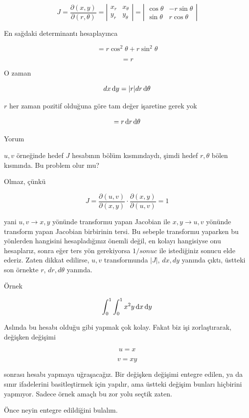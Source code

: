 \documentclass[12pt,fleqn]{article}\usepackage{../../common}
\begin{document}
$$ J = \frac{\partial (x,y)}{\partial(r,\theta)}  =
\left|\begin{array}{rr}
x_r & x_\theta \\
y_r & y_\theta
\end{array}\right|   =
\left|\begin{array}{rr}
\cos\theta & -r\sin\theta\\
\sin\theta & r\cos\theta
\end{array}\right|
$$

En sağdaki determinantı hesaplayınca

$$ = r\cos^2\theta + r\sin^2\theta $$

$$ = r $$

O zaman 

$$ dx \,\mathrm{d} y = |r| dr \,\mathrm{d} \theta $$

$r$ her zaman pozitif olduğuna göre tam değer işaretine gerek yok

$$ = r \,\mathrm{d} r \,\mathrm{d} \theta$$

Yorum 

$u,v$ örneğinde hedef $J$ hesabının bölüm kısmındaydı, şimdi hedef
$r,\theta$ bölen kısmında. Bu problem olur mu? 

Olmaz, çünkü 

$$ J = \frac{\partial (u,v)}{\partial(x,y)} \cdot
\frac{\partial (x,y)}{\partial(u,v)} = 1
 $$

yani $u,v \to x,y$ yönünde transformu yapan Jacobian ile $x,y \to u,v$ yönünde
transform yapan Jacobian birbirinin tersi. Bu sebeple transformu yaparken bu
yönlerden hangisini hesapladığınız önemli değil, en kolayı hangisiyse onu
hesaplarız, sonra eğer ters yön gerekiyorsa $1 / sonuc$ ile istediğiniz sonucu
elde ederiz. Zaten dikkat edilirse, $u,v$ transformunda $|J|$, $dx,dy$ yanında
çıktı, üstteki son örnekte $r$, $dr,d\theta$ yanında.

Örnek

$$ \int_0^1 \int_0^1 x^2y \,\mathrm{d} x \,\mathrm{d} y  $$

Aslında bu hesabı olduğu gibi yapmak çok kolay. Fakat biz işi zorlaştırarak,
değişken değişimi

$$ u =x  $$

$$ v = xy $$

sonrası hesabı yapmaya uğraşacağız. Bir değişken değişimi entegre edilen, ya da
sınır ifadelerini basitleştirmek için yapılır, ama üstteki değişim bunları
hiçbirini yapmıyor. Sadece örnek amaçlı bu zor yolu seçtik zaten.

Önce neyin entegre edildiğini bulalım. 
\end{document}
